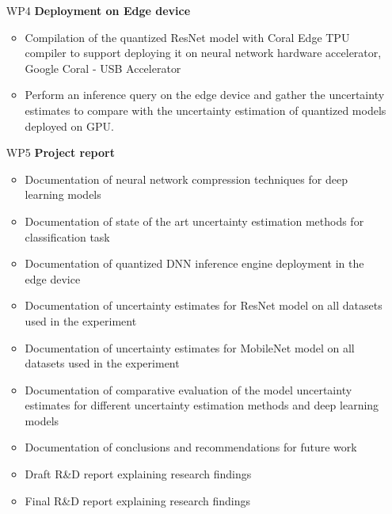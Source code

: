 \documentclass[rnd]{mas_proposal}
\begin{document}
\begin{enumerate}
    \item[WP4] \textbf{Deployment on Edge device}
        \begin{itemize}
        \item Compilation of the quantized ResNet model with Coral Edge TPU compiler to support deploying it on neural network hardware accelerator, Google Coral - USB Accelerator
        \item Perform an inference query on the edge device and gather the uncertainty estimates to compare with the uncertainty estimation of quantized models deployed on GPU.
        \end{itemize}
        
    \item[WP5] \textbf{Project report}
        \begin{itemize}
        \item Documentation of neural network compression techniques for deep learning models
        \item Documentation of state of the art uncertainty estimation methods for classification task
        \item Documentation of quantized DNN inference engine deployment in the edge device
        \item Documentation of uncertainty estimates for ResNet model on all datasets used in the experiment
        \item Documentation of uncertainty estimates for MobileNet model on all datasets used in the experiment
        \item Documentation of comparative evaluation of the model uncertainty estimates for different uncertainty estimation methods and deep learning models
        \item Documentation of conclusions and recommendations for future work
        \item Draft R\&D report explaining research findings
        \item Final R\&D report explaining research findings
        \end{itemize}
\end{enumerate}
\end{document}
